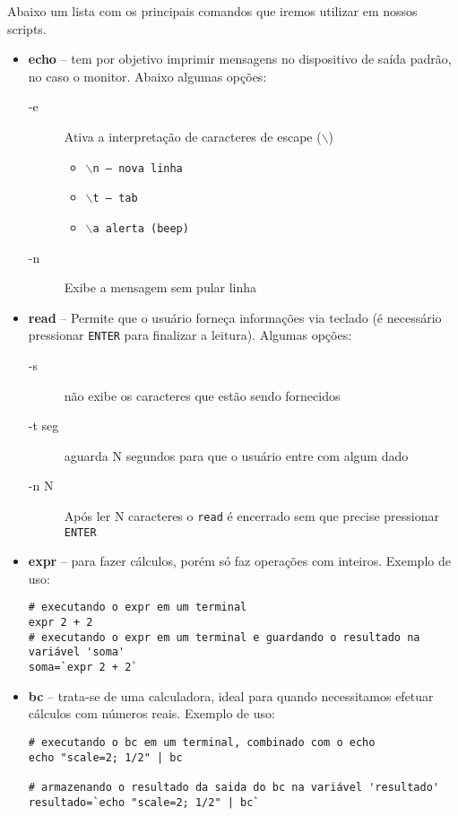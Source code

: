 \documentclass[11pt]{../classes/ifscarticle}
\begin{document}
Abaixo um lista com os principais comandos que iremos utilizar em nossos scripts.

\begin{itemize}
	\item \textbf{echo} -- tem por objetivo imprimir mensagens no dispositivo de saída padrão, no caso o monitor. Abaixo algumas opções:
	\begin{description}
		\item[-e] Ativa a interpretação de caracteres de escape (\texttt{$\backslash$})
		\begin{itemize}
			\item $\backslash$\texttt{n -- nova linha}
			\item $\backslash$\texttt{t -- tab}
			\item $\backslash$\texttt{a alerta (beep)}
		\end{itemize}
		\item[-n] Exibe a mensagem sem pular linha
	\end{description}
	\item \textbf{read} -- Permite que o usuário forneça informações via teclado (é necessário pressionar \texttt{ENTER} para finalizar a leitura). Algumas opções:
	\begin{description}
		\item[-s] não exibe os caracteres que estão sendo fornecidos
		\item[-t seg] aguarda N segundos para que o usuário entre com algum dado
		\item[-n N] Após ler N caracteres o \texttt{read} é encerrado sem que precise pressionar \texttt{ENTER} 
	\end{description}
	\item \textbf{expr} -- para fazer cálculos, porém só faz operações com inteiros. Exemplo de uso: 
\begin{lstlisting}
# executando o expr em um terminal
expr 2 + 2
# executando o expr em um terminal e guardando o resultado na variável 'soma'
soma=`expr 2 + 2`
\end{lstlisting}
	\item \textbf{bc} -- trata-se de uma calculadora, ideal para quando necessitamos efetuar cálculos com números reais. Exemplo de uso: 
\begin{lstlisting}
# executando o bc em um terminal, combinado com o echo
echo "scale=2; 1/2" | bc

# armazenando o resultado da saida do bc na variável 'resultado'
resultado=`echo "scale=2; 1/2" | bc`
\end{lstlisting}

\end{itemize}
\end{document}
